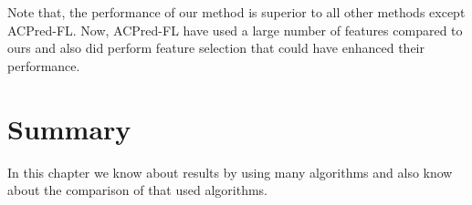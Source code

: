 Note that, the performance of our method is superior to all other methods except ACPred-FL. Now, ACPred-FL have used a large number of features compared to ours and also did perform feature selection that could have enhanced their performance.

\section{Summary}
In this chapter we know about results by using many algorithms and also know about the comparison of that used algorithms.
